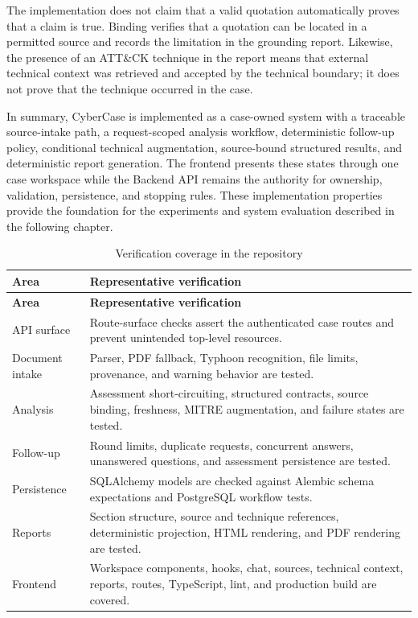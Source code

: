 The implementation does not claim that a valid quotation automatically proves that a claim is true. Binding verifies that a quotation can be located in a permitted source and records the limitation in the grounding report. Likewise, the presence of an ATT\&CK technique in the report means that external technical context was retrieved and accepted by the technical boundary; it does not prove that the technique occurred in the case.

In summary, CyberCase is implemented as a case-owned system with a traceable source-intake path, a request-scoped analysis workflow, deterministic follow-up policy, conditional technical augmentation, source-bound structured results, and deterministic report generation. The frontend presents these states through one case workspace while the Backend API remains the authority for ownership, validation, persistence, and stopping rules. These implementation properties provide the foundation for the experiments and system evaluation described in the following chapter.

\begin{longtable}{@{}>{\raggedright\arraybackslash}p{} >{\raggedright\arraybackslash}p{}@{}}
\caption{Verification coverage in the repository}\label{tab:4-8}\\
\toprule
\textbf{Area} & \textbf{Representative verification} \\
\midrule
\endfirsthead
\textbf{Area} & \textbf{Representative verification} \\
\midrule
\endhead
API surface & Route-surface checks assert the authenticated case routes and prevent unintended top-level resources. \\
Document intake & Parser, PDF fallback, Typhoon recognition, file limits, provenance, and warning behavior are tested. \\
Analysis & Assessment short-circuiting, structured contracts, source binding, freshness, MITRE augmentation, and failure states are tested. \\
Follow-up & Round limits, duplicate requests, concurrent answers, unanswered questions, and assessment persistence are tested. \\
Persistence & SQLAlchemy models are checked against Alembic schema expectations and PostgreSQL workflow tests. \\
Reports & Section structure, source and technique references, deterministic projection, HTML rendering, and PDF rendering are tested. \\
Frontend & Workspace components, hooks, chat, sources, technical context, reports, routes, TypeScript, lint, and production build are covered. \\
\bottomrule
\end{longtable}
